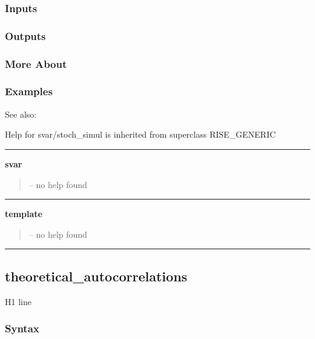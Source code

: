 \documentclass[letterpaper,10pt,english]{sphinxmanual}
\begin{document}
\subsubsection{Inputs}
\label{classes/models/@svar/svar:id129}

\subsubsection{Outputs}
\label{classes/models/@svar/svar:id130}

\subsubsection{More About}
\label{classes/models/@svar/svar:id131}

\subsubsection{Examples}
\label{classes/models/@svar/svar:id132}
See also:

Help for svar/stoch\_simul is inherited from superclass RISE\_GENERIC


\bigskip\hrule{}\bigskip

\label{classes/models/@svar/svar:svar}
\textbf{svar}
\begin{quote}

-- no help found
\end{quote}


\bigskip\hrule{}\bigskip

\label{classes/models/@svar/svar:template}
\textbf{template}
\begin{quote}

-- no help found
\end{quote}


\bigskip\hrule{}\bigskip



\subsection{theoretical\_autocorrelations}
\label{classes/models/@svar/svar:theoretical-autocorrelations}\label{classes/models/@svar/svar:id133}
H1 line


\subsubsection{Syntax}
\label{classes/models/@svar/svar:id134}
\end{document}
